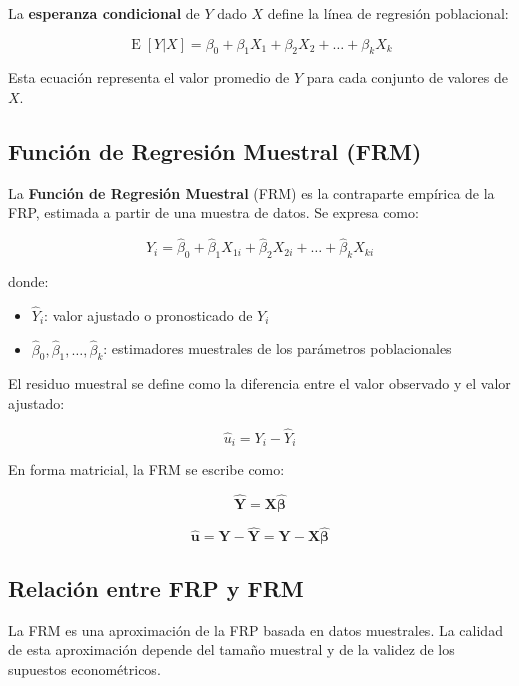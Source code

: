 \documentclass[11pt,a4paper]{article}
\DeclareMathOperator{\E}{E}
\begin{document}
La \textbf{esperanza condicional} de \(Y\) dado \(X\) define la línea de regresión poblacional:

\[
\E[Y|X] = \beta_0 + \beta_1 X_{1} + \beta_2 X_{2} + \dots + \beta_k X_{k}
\]

Esta ecuación representa el valor promedio de \(Y\) para cada conjunto de valores de \(X\).

\subsection{Función de Regresión Muestral (FRM)}

\begin{definicion}[FRM]
La \textbf{Función de Regresión Muestral} (FRM) es la contraparte empírica de la FRP, estimada a partir de una muestra de datos. Se expresa como:

\[
\boxed{\hat{Y}_i = \hat{\beta}_0 + \hat{\beta}_1 X_{1i} + \hat{\beta}_2 X_{2i} + \dots + \hat{\beta}_k X_{ki}}
\]

donde:
\begin{itemize}
    \item \(\hat{Y}_i\): valor ajustado o pronosticado de \(Y_i\)
    \item \(\hat{\beta}_0, \hat{\beta}_1, \dots, \hat{\beta}_k\): estimadores muestrales de los parámetros poblacionales
\end{itemize}

El residuo muestral se define como la diferencia entre el valor observado y el valor ajustado:

\[
\boxed{\hat{u}_i = Y_i - \hat{Y}_i}
\]

En forma matricial, la FRM se escribe como:

\[
\hat{\mathbf{Y}} = \mathbf{X}\hat{\boldsymbol{\beta}}
\]

\[
\hat{\mathbf{u}} = \mathbf{Y} - \hat{\mathbf{Y}} = \mathbf{Y} - \mathbf{X}\hat{\boldsymbol{\beta}}
\]
\end{definicion}

\subsection{Relación entre FRP y FRM}

La FRM es una aproximación de la FRP basada en datos muestrales. La calidad de esta aproximación depende del tamaño muestral y de la validez de los supuestos econométricos.
\end{document}
